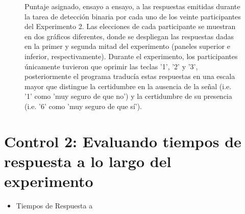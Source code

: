 \begin{figure}[th]
\caption[Rating_Exp2]{Puntaje asignado, ensayo a ensayo, a las respuestas emitidas durante la tarea de detección binaria por cada uno de los veinte participantes del Experimento 2. Las elecciones de cada participante se muestran en dos gráficos diferentes, donde se despliegan las respuestas dadas en la primer y segunda mitad del experimento (paneles superior e inferior, respectivamente). Durante el experimento, los participantes únicamente tuvieron que oprimir las teclas '1', '2' y '3', posteriormente el programa traducía estas respuestas en una escala mayor que distingue la certidumbre en la ausencia de la señal (i.e. '1' como 'muy seguro de que no') y la certidumbre de su presencia (i.e. '6' como 'muy seguro de que sí').}
\label{fig:Rating_E2}
\end{figure}
















\section{Control 2: Evaluando tiempos de respuesta a lo largo del experimento}

\begin{itemize}
\item Tiempos de Respuesta a 
\end{itemize}

